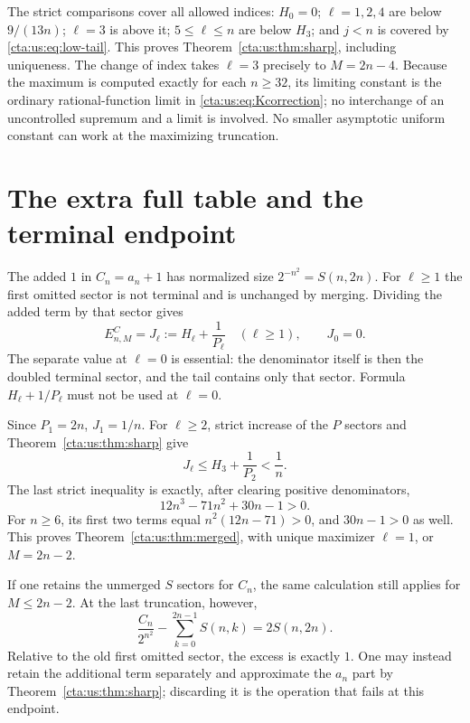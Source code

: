 \documentclass[11pt]{article}
\theoremstyle{definition}
\theoremstyle{remark}
\begin{document}
The strict comparisons cover all allowed indices: $H_0=0$;
$\ell=1,2,4$ are below $9/(13n)$; $\ell=3$ is above it;
$5\le\ell\le n$ are below $H_3$; and $j<n$ is covered by
\eqref{cta:us:eq:low-tail}. This proves Theorem~\ref{cta:us:thm:sharp}, including
uniqueness. The change of index takes $\ell=3$ precisely to
$M=2n-4$. Because the maximum is computed exactly for each $n\ge32$,
its limiting constant is the ordinary rational-function limit in
\eqref{cta:us:eq:Kcorrection}; no interchange of an uncontrolled supremum
and a limit is involved. No smaller asymptotic uniform constant can
work at the maximizing truncation.

\section{The extra full table and the terminal endpoint}\label{cta:us:sec:terminal}

The added $1$ in $C_n=a_n+1$ has normalized size $2^{-n^2}=S(n,2n)$.
For $\ell\ge1$ the first omitted sector is not terminal and is unchanged
by merging. Dividing the added term by that sector gives
\begin{equation}\label{cta:us:eq:J}
 E^C_{n,M}=J_\ell:=H_\ell+\frac1{P_\ell}
 \quad(\ell\ge1),\qquad J_0=0.
\end{equation}
The separate value at $\ell=0$ is essential: the denominator itself
is then the doubled terminal sector, and the tail contains only that
sector. Formula $H_\ell+1/P_\ell$ must not be used at $\ell=0$.

Since $P_1=2n$, $J_1=1/n$. For $\ell\ge2$, strict increase of the
$P$ sectors and Theorem~\ref{cta:us:thm:sharp} give
\[
 J_\ell\le H_3+\frac1{P_2}<\frac1n.
\]
The last strict inequality is exactly, after clearing positive
denominators,
\begin{equation}\label{cta:us:eq:merged-positive}
 12n^3-71n^2+30n-1>0.
\end{equation}
For $n\ge6$, its first two terms equal $n^2(12n-71)>0$, and
$30n-1>0$ as well. This proves Theorem~\ref{cta:us:thm:merged}, with unique
maximizer $\ell=1$, or $M=2n-2$.

If one retains the unmerged $S$ sectors for $C_n$, the same calculation
still applies for $M\le2n-2$. At the last truncation, however,
\[
 \frac{C_n}{2^{n^2}}-\sum_{k=0}^{2n-1}S(n,k)
 =2S(n,2n).
\]
Relative to the old first omitted sector, the excess is exactly $1$.
One may instead retain the additional term separately and approximate
the $a_n$ part by Theorem~\ref{cta:us:thm:sharp}; discarding it is the
operation that fails at this endpoint.
\end{document}
